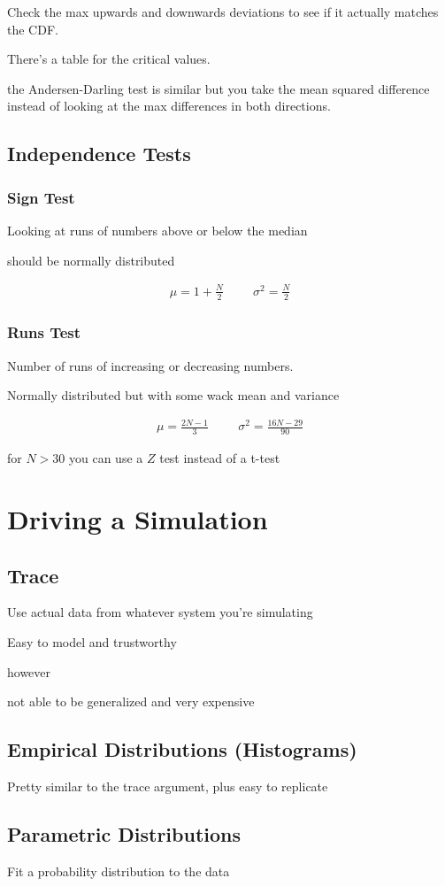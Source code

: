 \documentclass[fleqn]{report}
\newcommand{\hp}{\hspace{1cm}}
\newcommand{\equations} [1] {
\begin{gather*}
#1
\end{gather*}
}
\begin{document}
Check the max upwards and downwards deviations to see if it actually matches the 
CDF.

There's a table for the critical values. 

the Andersen-Darling test is similar but you take the mean squared 
difference instead of looking at the max differences in both directions. 

\section{Independence Tests}
\subsection{Sign Test}
Looking at runs of numbers above or below the median 

should be normally distributed 
\equations{
    \mu 
    =
    1 + \frac{N}{2}
    \hp 
    \sigma^2
    =
    \frac{N}{2}
}

\subsection{Runs Test}
Number of runs of increasing or decreasing numbers.

Normally distributed but with some wack mean and variance 
\equations{
    \mu 
    =
    \frac{2N - 1}{3}
    \hp 
    \sigma^2 
    =
    \frac{16N - 29}{90}
}

for $N > 30$ you can use a $Z$ test instead of a t-test 

\chapter{Driving a Simulation}
\section{Trace}
Use actual data from whatever system you're simulating 

Easy to model and trustworthy

however 

not able to be generalized and very expensive 

\section{Empirical Distributions (Histograms)}
Pretty similar to the trace argument, plus easy to replicate 

\section{Parametric Distributions}
Fit a probability distribution to the data 
\end{document}
